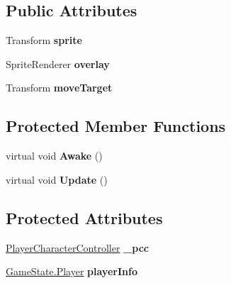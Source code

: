 \subsection*{Public Attributes}
\begin{DoxyCompactItemize}
\item 
\hypertarget{class_player_reference_a32979ccda155fe50f781e80c8bcfc5bd}{Transform {\bfseries sprite}}\label{class_player_reference_a32979ccda155fe50f781e80c8bcfc5bd}

\item 
\hypertarget{class_player_reference_a46a995f93fe98882b1a79d57b0baa66b}{Sprite\-Renderer {\bfseries overlay}}\label{class_player_reference_a46a995f93fe98882b1a79d57b0baa66b}

\item 
\hypertarget{class_player_reference_accd3ff8958657fee1e45aeb824b3e8e2}{Transform {\bfseries move\-Target}}\label{class_player_reference_accd3ff8958657fee1e45aeb824b3e8e2}

\end{DoxyCompactItemize}
\subsection*{Protected Member Functions}
\begin{DoxyCompactItemize}
\item 
\hypertarget{class_player_reference_adce9feacb370df0b0ea95754376aec04}{virtual void {\bfseries Awake} ()}\label{class_player_reference_adce9feacb370df0b0ea95754376aec04}

\item 
\hypertarget{class_player_reference_ad75981d8a0e56d56370a27b9fcca1e91}{virtual void {\bfseries Update} ()}\label{class_player_reference_ad75981d8a0e56d56370a27b9fcca1e91}

\end{DoxyCompactItemize}
\subsection*{Protected Attributes}
\begin{DoxyCompactItemize}
\item 
\hypertarget{class_player_reference_ae076e8379386c67d01beb3d76c3b4600}{\hyperlink{class_player_character_controller}{Player\-Character\-Controller} {\bfseries \-\_\-pcc}}\label{class_player_reference_ae076e8379386c67d01beb3d76c3b4600}

\item 
\hypertarget{class_player_reference_abffbcb7165e1d2fbb37b536d87eca369}{\hyperlink{class_game_state_1_1_player}{Game\-State.\-Player} {\bfseries player\-Info}}\label{class_player_reference_abffbcb7165e1d2fbb37b536d87eca369}

\end{DoxyCompactItemize}
